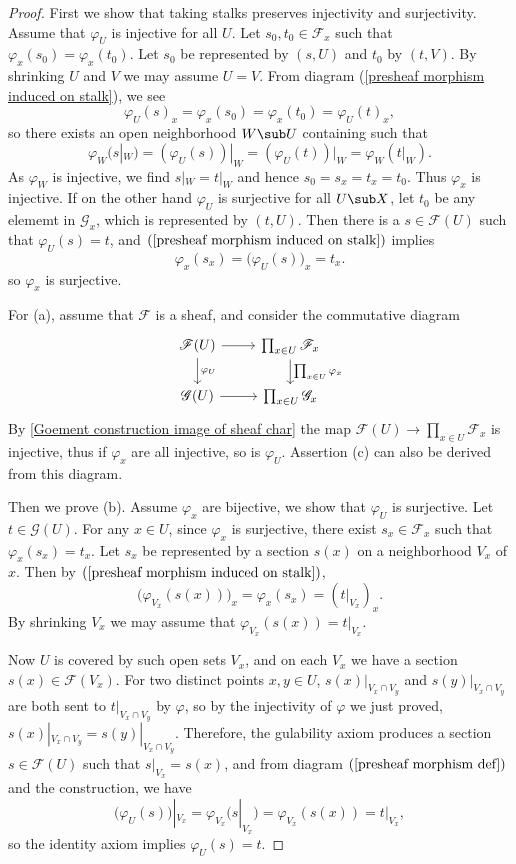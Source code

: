 \begin{proof}
First we show that taking stalks preserves injectivity and surjectivity. Assume that $\varphi_U$ is injective for all $U$. Let $s_0,t_0\in\mathscr{F}_x$ such that $\varphi_x(s_0)=\varphi_x(t_0)$. Let $s_0$ be represented by $(s,U)$ and $t_0$ by $(t,V)$. By shrinking $U$ and $V$ we may assume $U=V$. From diagram (\ref{presheaf morphism induced on stalk}), we see
\[\varphi_U(s)_x=\varphi_x(s_0)=\varphi_x(t_0)=\varphi_U(t)_x,\]
so there exists an open neighborhood $W\sub U$ containing such that
\[\varphi_W(s|_W)=(\varphi_U(s))|_W=(\varphi_U(t))|_W=\varphi_W(t|_W).\]
As $\varphi_W$ is injective, we find $s|_W=t|_W$ and hence $s_0=s_x=t_x=t_0$. Thus $\varphi_x$ is injective. If on the other hand $\varphi_U$ is surjective for all $U\sub X$, let $t_0$ be any elememt in $\mathscr{G}_x$, which is represented by $(t,U)$. Then there is a $s\in\mathscr{F}(U)$ such that $\varphi_U(s)=t$, and $(\ref{presheaf morphism induced on stalk})$ implies
\[\varphi_x(s_x)=\big(\varphi_U(s)\big)_x=t_x.\]
so $\varphi_x$ is surjective.\par
For (a), assume that $\mathscr{F}$ is a sheaf, and consider the commutative diagram
\[\begin{tikzcd}
\mathscr{F}(U)\ar[r]\ar[d,"\varphi_U"]&\prod_{x\in U}\mathscr{F}_x\ar[d,"\prod_{x\in U}\varphi_x"]\\
\mathscr{G}(U)\ar[r]&\prod_{x\in U}\mathscr{G}_x
\end{tikzcd}\]
By \cref{Goement construction image of sheaf char} the map $\mathscr{F}(U)\to\prod_{x\in U}\mathscr{F}_x$ is injective, thus if $\varphi_x$ are all injective, so is $\varphi_U$. Assertion (c) can also be derived from this diagram.\par
Then we prove (b). Assume $\varphi_x$ are bijective, we show that $\varphi_U$ is surjective. Let $t\in\mathscr{G}(U)$. For any $x\in U$, since $\varphi_x$ is surjective, there exist $s_x\in\mathscr{F}_x$ such that $\varphi_x(s_x)=t_x$. Let $s_x$ be represented by a section $s(x)$ on a neighborhood $V_x$ of $x$. Then by $(\ref{presheaf morphism induced on stalk})$,
\[\big(\varphi_{V_x}(s(x))\big)_x=\varphi_x(s_x)=(t|_{V_x})_x.\]
By shrinking $V_x$ we may assume that $\varphi_{V_x}(s(x))=t|_{V_x}$.\par 
Now $U$ is covered by such open sets $V_x$, and on each $V_x$ we have a section $s(x)\in\mathscr{F}(V_x)$. For two distinct points $x,y\in U$, $s(x)|_{V_x\cap V_y}$ and $s(y)|_{V_x\cap V_y}$ are both sent to $t|_{V_x\cap V_y}$ by $\varphi$, so by the injectivity of $\varphi$ we just proved, $s(x)|_{V_x\cap V_y}=s(y)|_{V_x\cap V_y}$. Therefore, the gulability axiom produces a section $s\in\mathscr{F}(U)$ such that $s|_{V_x}=s(x)$, and from diagram $(\ref{presheaf morphism def})$ and the construction, we have
\[\big(\varphi_{U}(s)\big)|_{V_x}=\varphi_{V_x}(s|_{V_x})=\varphi_{V_x}(s(x))=t|_{V_x},\]
so the identity axiom implies $\varphi_U(s)=t$.
\end{proof}
